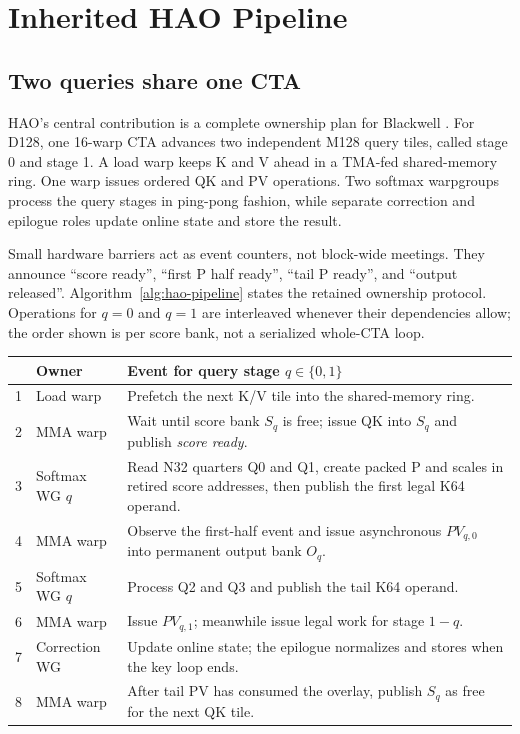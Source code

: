 \section{Inherited HAO Pipeline}

\subsection{Two queries share one CTA}

HAO's central contribution is a complete ownership plan for Blackwell
\cite{hao2026fp4flashattention}. For D128, one 16-warp CTA advances two
independent M128 query tiles, called stage 0 and stage 1. A load warp keeps K
and V ahead in a TMA-fed shared-memory ring. One warp issues ordered QK and PV
operations. Two softmax warpgroups process the query stages in ping-pong
fashion, while separate correction and epilogue roles update online state and
store the result.

Small hardware barriers act as event counters, not block-wide meetings. They
announce ``score ready'', ``first P half ready'', ``tail P ready'', and
``output released''. Algorithm~\ref{alg:hao-pipeline} states the retained
ownership protocol. Operations for $q=0$ and $q=1$ are interleaved whenever
their dependencies allow; the order shown is per score bank, not a serialized
whole-CTA loop.

\begin{algorithm}[htbp]
\caption{Two-query score-to-PV ownership protocol inherited from HAO}
\label{alg:hao-pipeline}
\small
\begin{tabularx}{\textwidth}{@{}r p{} X@{}}
\toprule
& Owner & Event for query stage $q\in\{0,1\}$ \\
\midrule
1 & Load warp & Prefetch the next K/V tile into the shared-memory ring. \\
2 & MMA warp & Wait until score bank $S_q$ is free; issue QK into $S_q$ and publish \emph{score ready}. \\
3 & Softmax WG $q$ & Read N32 quarters Q0 and Q1, create packed P and scales in retired score addresses, then publish the first legal K64 operand. \\
4 & MMA warp & Observe the first-half event and issue asynchronous $PV_{q,0}$ into permanent output bank $O_q$. \\
5 & Softmax WG $q$ & Process Q2 and Q3 and publish the tail K64 operand. \\
6 & MMA warp & Issue $PV_{q,1}$; meanwhile issue legal work for stage $1-q$. \\
7 & Correction WG & Update online state; the epilogue normalizes and stores when the key loop ends. \\
8 & MMA warp & After tail PV has consumed the overlay, publish $S_q$ as free for the next QK tile. \\
\bottomrule
\end{tabularx}
\end{algorithm}

